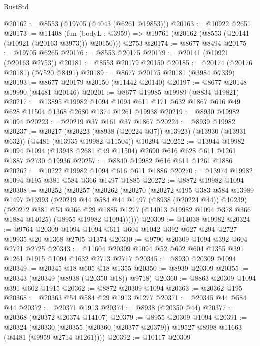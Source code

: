 \begin{lexlean}{RustStd}
\begin{coremodule}
@20162 := @8553 (@19705 (@4043 (@6261 @19853)))
@20163 := @10922 @2651
@20173 := @11408
    (fun (bodyL : @3959) => @19761 (@20162 (@8553 (@20141 (@10921 (@20163 @3973))) @20150)))
    @2753
@20174 := @8677 @8494
@20175 := @19705 @6265
@20176 := @8553 @20175
@20179 := @20141 (@10921 (@20163 @2753))
@20181 := @8553 @20179 @20150
@20185 := @20174 (@20176 @20181) (@7520 @8491)
@20189 := @8677 @20175 @20181 (@3984 @7339)
@20193 := @8677 @20179 @20150 (@11442 @20140)
@20197 := @8677 @20148 @19990 (@4481 @20146)
@20201 := @8677 @19985 @19989 (@8834 @19821)
@20217 := @13895
    @19982
    @1094
    @1094
    @611
    @171
    @632
    @1867
    @616
    @49
    @628
    @11504
    @1368
    @2680
    @1374
    @1261
    @19938
@20219 := @8930 @19982 @1094
@20223 := @20219 @37 @161 @37 @1867
@20224 := @8939 @19982
@20237 := @20217
    (@20223 (@8938 (@20224 @37)) @13923)
    (@13930 (@13931 @632))
    (@4481 (@13935 @19982 @11504))
    @10294
@20252 := @13944
    @19982
    @1094
    @1094
    (@13948 @2681 @49 @11504)
    @2690
    @616
    @628
    @611
    @1261
    @1887
    @2730
    @19936
@20257 := @8840 @19982 @616 @611 @1261 @1886
@20262 := @10222 @19982 @1094 @616 @611 @1886
@20270 := @13974 @19982 @1094 @195 @381 @584 @366 @1497 @1885
@20272 := @8872 @19982 @1094
@20308 := @20252
    (@20257
      (@20262
        (@20270
          (@20272
            @195
            @383
            @584
            @13989
            @1497
            @13993
            (@20219 @44 @584 @44 @1497 (@8938 (@20224 @44)) @10239)
            (@20272
              @381
              @54
              @366
              @29
              @1885
              @1277
              (@14013 @19982 @1094 @378 @366 @1884 @14025)
              (@8955 @19982 @1094))))))
@20309 := @14038 @19982
@20324 := @9764 @20309 @1094 @1094 @611 @604 @1042 @392 @627 @294 @2727 @19935 @20 @1368 @2705 @1374
@20330 := @9790 @20309 @1094 @392 @604 @2721 @2725
@20343 := @11604 @20309 @1094 @52 @602 @604 @1355 @391 @1261 @1915 @1094 @1632 @2713 @2717
@20345 := @8930 @20309 @1094
@20349 := @20345 @18 @605 @18 @1355
@20350 := @8939 @20309
@20355 := @20343 (@20349 (@8938 (@20350 @18)) @9718)
@20360 := @8863 @20309 @1094 @391 @602 @1915
@20362 := @8872 @20309 @1094
@20363 := @20362 @195
@20368 := @20363 @54 @584 @29 @1913 @1277
@20371 := @20345 @44 @584 @44
@20372 := @20371 @1913
@20374 := @8938 (@20350 @44)
@20377 := @20368 (@20372 @20374 @14107)
@20379 := @8955 @20309 @1094
@20391 := @20324
    (@20330 (@20355 (@20360 (@20377 @20379)) @19527 @8998 @11663 (@4481 (@9959 @2714 @1261))))
@20392 := @10117 @20309

\end{coremodule}
\end{lexlean}
